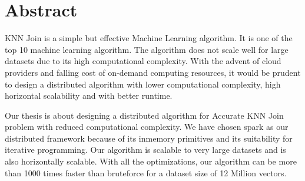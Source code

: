 \chapter*{Abstract}
KNN Join is a simple but effective Machine Learning algorithm. It is
one of the top 10 machine learning algorithm. The algorithm does not
scale well for large datasets due to its high computational
complexity. With the advent of cloud providers and falling cost of
on-demand computing resources, it would be prudent to design a
distributed algorithm with lower computational complexity, high
horizontal scalability and with better runtime.

Our thesis is about designing a distributed algorithm for Accurate
KNN Join problem with reduced computational complexity. We have chosen spark as our
distributed framework because of its inmemory primitives and its
suitability for iterative programming. Our algorithm is scalable to
very large datasets and is also horizontally scalable. With all the
optimizations, our algorithm can be more than 1000 times faster than
bruteforce for a dataset size of 12 Million vectors.
